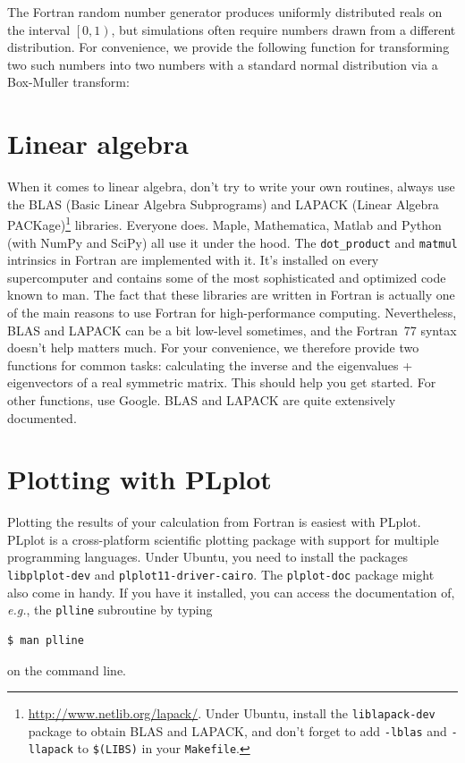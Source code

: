 \documentclass[openany,oneside]{report}
\begin{document}
The Fortran random number generator produces uniformly distributed reals on the interval $\left[0, 1\right)$, but simulations often require numbers drawn from a different distribution. 
For convenience, we provide the following function for transforming two such numbers into two numbers with a standard normal distribution via a Box-Muller transform:


\chapter{Linear algebra}
\label{chap:Linear algebra}

When it comes to linear algebra, don't try to write your own routines, always use the BLAS (Basic Linear Algebra Subprograms) and LAPACK (Linear Algebra PACKage)\footnote{\url{http://www.netlib.org/lapack/}.
Under Ubuntu, install the \texttt{liblapack-dev} package to obtain BLAS and LAPACK, and don't forget to add \texttt{-lblas} and \texttt{-llapack} to \texttt{\$(LIBS)} in your \texttt{Makefile}.} libraries.
Everyone does.
Maple, Mathematica, Matlab and Python (with NumPy and SciPy) all use it under the hood.
The \texttt{dot\_product} and \texttt{matmul} intrinsics in Fortran are implemented with it.
It's installed on every supercomputer and contains some of the most sophisticated and optimized code known to man.
The fact that these libraries are written in Fortran is actually one of the main reasons to use Fortran for high-performance computing.
Nevertheless, BLAS and LAPACK can be a bit low-level sometimes, and the Fortran~77 syntax doesn't help matters much.
For your convenience, we therefore provide two functions for common tasks: calculating the inverse and the eigenvalues + eigenvectors of a real symmetric matrix.
This should help you get started.
For other functions, use Google.
BLAS and LAPACK are quite extensively documented.




\chapter{Plotting with PLplot}
\label{chap:PLplot}

Plotting the results of your calculation from Fortran is easiest with PLplot.
PLplot is a cross-platform scientific plotting package with support for multiple programming languages.
Under Ubuntu, you need to install the packages \texttt{libplplot-dev} and \texttt{plplot11-driver-cairo}.
The \texttt{plplot-doc} package might also come in handy.
If you have it installed, you can access the documentation of, \emph{e.g.}, the \texttt{plline} subroutine by typing
\begin{verbatim}
$ man plline
\end{verbatim}
on the command line.
\end{document}
